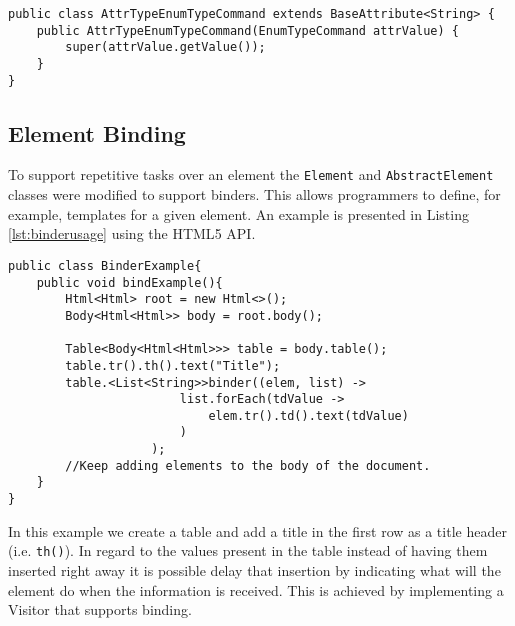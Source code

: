 \begin{minipage}{\linewidth}
\begin{lstlisting}[caption={Attribute Receiving An Enumeration},label={lst:enumusage}]
public class AttrTypeEnumTypeCommand extends BaseAttribute<String> {
    public AttrTypeEnumTypeCommand(EnumTypeCommand attrValue) {
        super(attrValue.getValue());
    }
}
\end{lstlisting}
\end{minipage}

\subsection{Element Binding}
\label{sec:elementbinding}

\noindent
To support repetitive tasks over an element the \texttt{Element} and \texttt{AbstractElement} classes were modified to support binders. This allows programmers to define, for example, templates for a given element. An example is presented in Listing \ref{lst:binderusage} using the \ac{HTML}5 \ac{API}.

\bigskip


\begin{minipage}{\linewidth}
\begin{lstlisting}[caption={Binder Usage Example},label={lst:binderusage}]
public class BinderExample{
    public void bindExample(){
        Html<Html> root = new Html<>();
        Body<Html<Html>> body = root.body();
        
        Table<Body<Html<Html>>> table = body.table();
        table.tr().th().text("Title");
        table.<List<String>>binder((elem, list) ->
                        list.forEach(tdValue ->
                            elem.tr().td().text(tdValue)
                        )
                    );
        //Keep adding elements to the body of the document.
    }
}
\end{lstlisting}
\end{minipage}

\noindent
In this example we create a table and add a title in the first row as a title header (i.e. \texttt{th()}). In regard to the values present in the table instead of having them inserted right away it is possible delay that insertion by indicating what will the element do when the information is received. This is achieved by implementing a Visitor that supports binding. 

